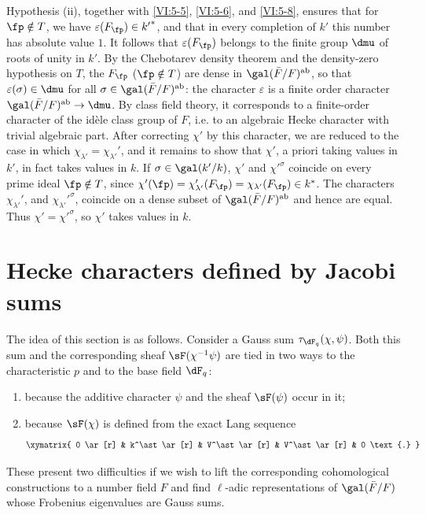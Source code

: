 Hypothesis (ii), together with \ref{VI:5-5}, \ref{VI:5-6}, and \ref{VI:5-8}, ensures that 
for $\fp\notin T$, we have $\varepsilon(F_\fp)\in {k'}^\ast$, and that in every 
completion of $k'$ this number has absolute value $1$. It follows that 
$\varepsilon(F_\fp)$ belongs to the finite group $\dmu$ of roots of unity 
in $k'$. By the Chebotarev density theorem and the density-zero hypothesis 
on $T$, the $F_\fp$ ($\fp\notin T$) are dense in 
  $\gal(\bar F/F)^\text{ab}$, so that $\varepsilon(\sigma)\in \dmu$ for all 
$\sigma\in \gal(\bar F/F)^\text{ab}$: the character $\varepsilon$ is a 
  finite order character $\gal(\bar F/F)^\text{ab}\to \dmu$. By 
class field theory, it corresponds to a finite-order character 
of the idèle class group of $F$, i.e. to an algebraic Hecke character 
with trivial algebraic part. After correcting $\chi'$ by this 
character, we are reduced to the case in which 
$\chi_{\lambda'}=\chi_{\lambda'}'$, and it remains to show that $\chi'$, 
a priori taking values in $k'$, in fact takes values in $k$. If 
$\sigma\in \gal(k'/k)$, $\chi'$ and ${\chi'}^\sigma$ coincide on every prime 
ideal $\fp\notin T$, since 
$\chi'(\fp) = \chi'_{\lambda'}(F_\fp) = \chi_{\lambda'}(F_\fp) \in k^\ast$. 
The characters $\chi_{\lambda'}'$, and ${\chi_{\lambda'}'}^\sigma$, coincide 
on a dense subset of $\gal(\bar F/F)^\text{ab}$ and hence are equal. Thus 
$\chi'={\chi'}^\sigma$, so $\chi'$ takes values in $k$. 










\section{Hecke characters defined by Jacobi sums}\label{VI:6}

The idea of this section is as follows. Consider a Gauss sum 
$\tau_{\dF_q}(\chi,\psi)$. Both this sum and the corresponding sheaf 
$\sF(\chi^{-1}\psi)$ are tied in two ways to the characteristic $p$ and to the 
base field $\dF_q$: 
\begin{enumerate}[\indent a)]
  \item because the additive character $\psi$ and the sheaf 
    $\sF(\psi)$ occur in it; 
  \item because $\sF(\chi)$ is defined from the exact Lang sequence 
    \[\xymatrix{
      0 \ar[r] 
        & k^\ast \ar[r] 
        & V^\ast \ar[r] 
        & V^\ast \ar[r] 
        & 0 \text{.} 
    }\]
\end{enumerate}
These present two difficulties if we wish to lift the corresponding 
cohomological constructions to a number field $F$ and find 
$\ell$-adic representations of $\gal(\bar F/F)$ whose Frobenius eigenvalues 
are Gauss sums. 

